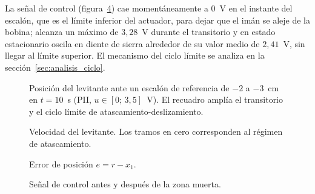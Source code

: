 La señal de control (figura~\ref{senal_control}) cae momentáneamente a 0~V en el instante del escalón, que es el límite inferior del actuador, para dejar que el imán se aleje de la bobina; alcanza un máximo de $3{,}28$~V durante el transitorio y en estado estacionario oscila en diente de sierra alrededor de su valor medio de $2{,}41$~V, sin llegar al límite superior. El mecanismo del ciclo límite se analiza en la sección~\ref{sec:analisis_ciclo}.

\begin{figure}[ht]
    \centering
    
    \caption[Posición (regulación)]{Posición del levitante ante un escalón de referencia de $-2$ a $-3$~cm en $t=10$~s (PII, $u\in[0;\,3{,}5]$~V). El recuadro amplía el transitorio y el ciclo límite de atascamiento-deslizamiento.}
    \label{posicion}
\end{figure}

\begin{figure}[ht]
    \centering
    
    \caption[Velocidad (regulación)]{Velocidad del levitante. Los tramos en cero corresponden al régimen de atascamiento.}
    \label{velocidad}
\end{figure}

\begin{figure}[ht]
    \centering
    
    \caption[Error (regulación)]{Error de posición $e=r-x_1$.}
    \label{error}
\end{figure}

\begin{figure}[ht]
    \centering
    
    \caption[Señal de control (regulación)]{Señal de control antes y después de la zona muerta.}
    \label{senal_control}
\end{figure}

\FloatBarrier
\newpage




